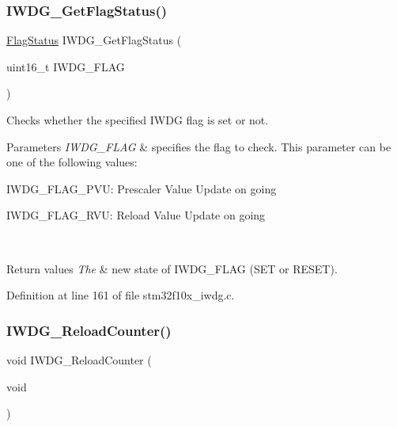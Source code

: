 \subsubsection{\texorpdfstring{I\+W\+D\+G\+\_\+\+Get\+Flag\+Status()}{IWDG\_GetFlagStatus()}}
{\footnotesize\ttfamily \hyperlink{group___exported__types_ga89136caac2e14c55151f527ac02daaff}{Flag\+Status} I\+W\+D\+G\+\_\+\+Get\+Flag\+Status (\begin{DoxyParamCaption}\item[{uint16\+\_\+t}]{I\+W\+D\+G\+\_\+\+F\+L\+AG }\end{DoxyParamCaption})}



Checks whether the specified I\+W\+DG flag is set or not. 


\begin{DoxyParams}{Parameters}
{\em I\+W\+D\+G\+\_\+\+F\+L\+AG} & specifies the flag to check. This parameter can be one of the following values\+: \begin{DoxyItemize}
\item I\+W\+D\+G\+\_\+\+F\+L\+A\+G\+\_\+\+P\+VU\+: Prescaler Value Update on going \item I\+W\+D\+G\+\_\+\+F\+L\+A\+G\+\_\+\+R\+VU\+: Reload Value Update on going \end{DoxyItemize}
\\
\hline
\end{DoxyParams}

\begin{DoxyRetVals}{Return values}
{\em The} & new state of I\+W\+D\+G\+\_\+\+F\+L\+AG (S\+ET or R\+E\+S\+ET). \\
\hline
\end{DoxyRetVals}


Definition at line 161 of file stm32f10x\+\_\+iwdg.\+c.

\mbox{\label{group___i_w_d_g___exported___functions_ga7147ebabdc3fef97f532b171a4e70d49}} 
\subsubsection{\texorpdfstring{I\+W\+D\+G\+\_\+\+Reload\+Counter()}{IWDG\_ReloadCounter()}}
{\footnotesize\ttfamily void I\+W\+D\+G\+\_\+\+Reload\+Counter (\begin{DoxyParamCaption}\item[{void}]{ }\end{DoxyParamCaption})}



